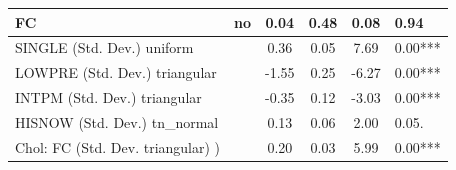 \begin{table}
\begin{center}
\begin{tabular}{|l|l|c|c|c|l|}
			\hline
			FC & no & 0.04 & 0.48 & 0.08 & 0.94 \\
			\hline
			SINGLE (Std. Dev.) uniform &  & 0.36 & 0.05 & 7.69 & 0.00*** \\
			\hline
			LOWPRE (Std. Dev.) triangular &  & -1.55 & 0.25 & -6.27 & 0.00*** \\
			\hline
			INTPM (Std. Dev.) triangular &  & -0.35 & 0.12 & -3.03 & 0.00*** \\
			\hline
			HISNOW (Std. Dev.) tn_normal &  & 0.13 & 0.06 & 2.00 & 0.05. \\
			\hline
			 Chol: FC (Std. Dev. triangular) ) &  & 0.20 & 0.03 & 5.99 & 0.00*** \\
			\hline
		\end{tabular}
	\end{center}
\end{table}